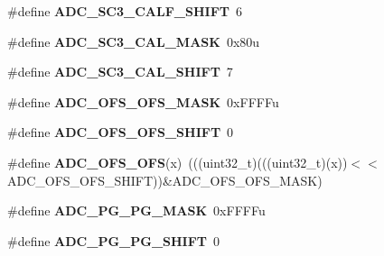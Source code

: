 \begin{DoxyCompactItemize}
\item 
\#define {\bfseries A\+D\+C\+\_\+\+S\+C3\+\_\+\+C\+A\+L\+F\+\_\+\+S\+H\+I\+FT}~6\hypertarget{group__ADC__Register__Masks_ga9fd60a35fc4c15b563078ecbd3eaa449}{}\label{group__ADC__Register__Masks_ga9fd60a35fc4c15b563078ecbd3eaa449}

\item 
\#define {\bfseries A\+D\+C\+\_\+\+S\+C3\+\_\+\+C\+A\+L\+\_\+\+M\+A\+SK}~0x80u\hypertarget{group__ADC__Register__Masks_ga0ec589c9101684eeac4af85452ed3673}{}\label{group__ADC__Register__Masks_ga0ec589c9101684eeac4af85452ed3673}

\item 
\#define {\bfseries A\+D\+C\+\_\+\+S\+C3\+\_\+\+C\+A\+L\+\_\+\+S\+H\+I\+FT}~7\hypertarget{group__ADC__Register__Masks_ga808101f85e6ceff194c212faacf4bd9d}{}\label{group__ADC__Register__Masks_ga808101f85e6ceff194c212faacf4bd9d}

\item 
\#define {\bfseries A\+D\+C\+\_\+\+O\+F\+S\+\_\+\+O\+F\+S\+\_\+\+M\+A\+SK}~0x\+F\+F\+F\+Fu\hypertarget{group__ADC__Register__Masks_ga1532ae43eb63d6c071f531cca89fdb68}{}\label{group__ADC__Register__Masks_ga1532ae43eb63d6c071f531cca89fdb68}

\item 
\#define {\bfseries A\+D\+C\+\_\+\+O\+F\+S\+\_\+\+O\+F\+S\+\_\+\+S\+H\+I\+FT}~0\hypertarget{group__ADC__Register__Masks_ga86de5d25a5433db6e96700e2d000ad07}{}\label{group__ADC__Register__Masks_ga86de5d25a5433db6e96700e2d000ad07}

\item 
\#define {\bfseries A\+D\+C\+\_\+\+O\+F\+S\+\_\+\+O\+FS}(x)~(((uint32\+\_\+t)(((uint32\+\_\+t)(x))$<$$<$A\+D\+C\+\_\+\+O\+F\+S\+\_\+\+O\+F\+S\+\_\+\+S\+H\+I\+FT))\&A\+D\+C\+\_\+\+O\+F\+S\+\_\+\+O\+F\+S\+\_\+\+M\+A\+SK)\hypertarget{group__ADC__Register__Masks_gad48888faa6b880f4011253b53413f37b}{}\label{group__ADC__Register__Masks_gad48888faa6b880f4011253b53413f37b}

\item 
\#define {\bfseries A\+D\+C\+\_\+\+P\+G\+\_\+\+P\+G\+\_\+\+M\+A\+SK}~0x\+F\+F\+F\+Fu\hypertarget{group__ADC__Register__Masks_ga0619279d8dcf43af1fda9f27090ae51b}{}\label{group__ADC__Register__Masks_ga0619279d8dcf43af1fda9f27090ae51b}

\item 
\#define {\bfseries A\+D\+C\+\_\+\+P\+G\+\_\+\+P\+G\+\_\+\+S\+H\+I\+FT}~0\hypertarget{group__ADC__Register__Masks_ga014623fb35c473d12ff7fc64c3e8cfe3}{}\label{group__ADC__Register__Masks_ga014623fb35c473d12ff7fc64c3e8cfe3}


\end{DoxyCompactItemize}
